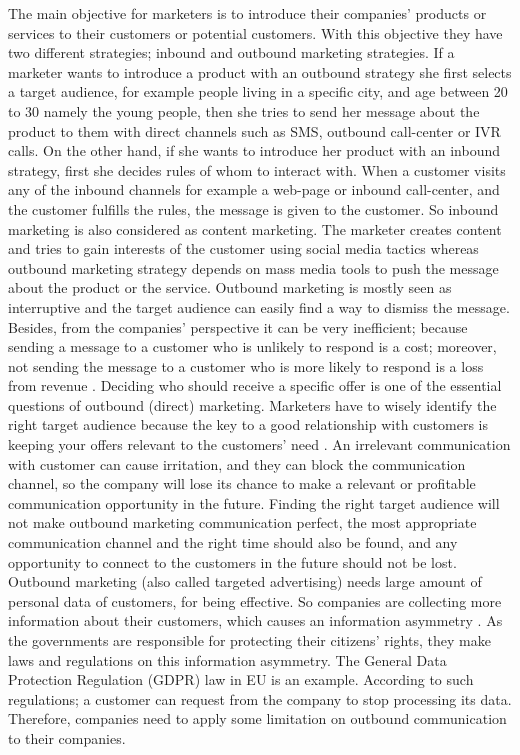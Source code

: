 \documentclass[11pt]{article}
\begin{document}
The main objective for marketers is to introduce their companies’ products or services to their customers or potential customers. With this objective they have two different strategies; inbound and outbound marketing strategies. If a marketer wants to introduce a product with an outbound strategy she first selects a target audience, for example people living in a specific city, and age between 20 to 30 namely the young people, then she tries to send her message about the product to them with direct channels such as SMS, outbound call-center or IVR calls. On the other hand, if she wants to introduce her product with an inbound strategy, first she decides rules of whom to interact with. When a customer visits any of the inbound channels for example a web-page or inbound call-center, and the customer fulfills the rules, the message is given to the customer. So inbound marketing is also considered as content marketing. The marketer creates content and tries to gain interests of the customer using social media tactics whereas outbound marketing strategy depends on mass media tools to push the message about the product or the service. Outbound marketing is mostly seen as interruptive and the target audience can easily find a way to dismiss the message. Besides, from the companies’ perspective it can be very inefficient; because sending a message to a customer who is unlikely to respond is a cost; moreover, not sending the message to a customer who is more likely to respond is a loss from revenue \citep{sarkar}. Deciding who should receive a specific offer is one of the essential questions of outbound (direct) marketing. Marketers have to wisely identify the right target audience because the key to a good relationship with customers is keeping your offers relevant to the customers’ need \citep{malthouse}. An irrelevant communication with customer can cause irritation, and they can block the communication channel, so the company will lose its chance to make a relevant or profitable communication opportunity in the future. Finding the right target audience will not make outbound marketing communication perfect, the most appropriate communication channel and the right time should also be found, and any opportunity to connect to the customers in the future should not be lost.\\

Outbound marketing (also called targeted advertising) needs large amount of personal data of customers, for being effective. So companies are collecting more information about their customers, which causes an information asymmetry \citep{waerdt}. As the governments are responsible for protecting their citizens’ rights, they make laws and regulations on this information asymmetry. The General Data Protection Regulation (GDPR) law in EU is an example. According to such regulations; a customer can request from the company to stop processing its data. Therefore, companies need to apply some limitation on outbound communication to their companies.\\
\end{document}
